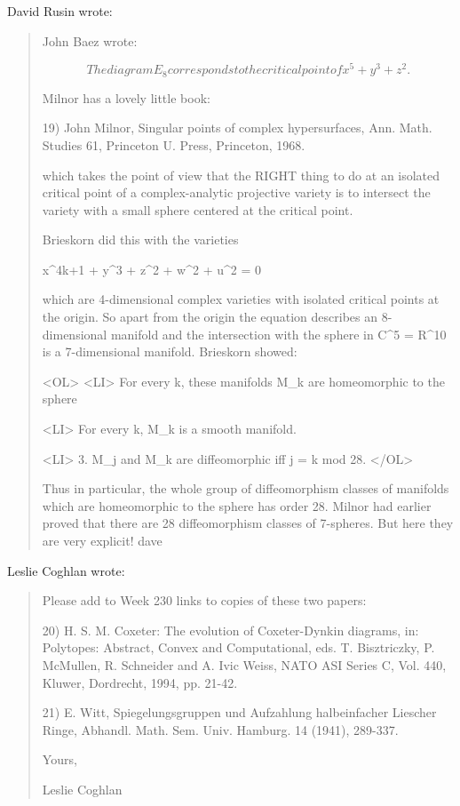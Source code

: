 David Rusin wrote:

\begin{quote}
  John Baez wrote:


$$

  The diagram E_{8} corresponds to the critical point of x^{5} + y^{3} + z^{2}.
$$
    

  Milnor has a lovely little book:

  19) John Milnor, Singular points of complex hypersurfaces, 
  Ann. Math. Studies 61, Princeton U. Press, Princeton, 1968.

  which takes the point of view that the RIGHT thing to do at an isolated
  critical point of a complex-analytic projective variety is to intersect
  the variety with a small sphere centered at the critical point.

   Brieskorn did this with the varieties

   x^{4k+1} + y^{3} + z^{2} + w^{2} + u^{2} = 0

   which are 4-dimensional complex varieties with isolated critical 
   points at the origin. So apart from the origin the equation 
   describes an 8-dimensional manifold and the intersection with the 
   sphere in C^{5} = R^{10} is a 7-dimensional manifold.  Brieskorn showed:

<OL>
<LI>
 For every k, these manifolds M_{k} are homeomorphic to the sphere

<LI> For every k, M_{k} is a smooth manifold.

<LI>
   3. M_{j} and M_{k} are diffeomorphic iff  j = k mod 28.
</OL>

   Thus in particular, the whole group of diffeomorphism classes of 
   manifolds which are homeomorphic to the sphere has order 28. 
   Milnor had earlier proved that there are 28 diffeomorphism 
   classes of 7-spheres.  But here they are very explicit!
   dave
\end{quote}

Leslie Coghlan wrote:

\begin{quote}
Please add to Week 230 links to copies of these two papers:

20) H. S. M. Coxeter: The evolution of Coxeter-Dynkin diagrams, in: 
Polytopes: Abstract, Convex and Computational, eds.
T. Bisztriczky, P.  McMullen, R. Schneider and A. Ivic Weiss,  
NATO ASI Series C, Vol. 440, Kluwer, Dordrecht, 1994, pp. 21-42.

21) E. Witt, Spiegelungsgruppen und Aufzahlung halbeinfacher Liescher Ringe,
Abhandl. Math. Sem. Univ. Hamburg. 14 (1941), 289-337.

  Yours,

  Leslie Coghlan
\end{quote}

